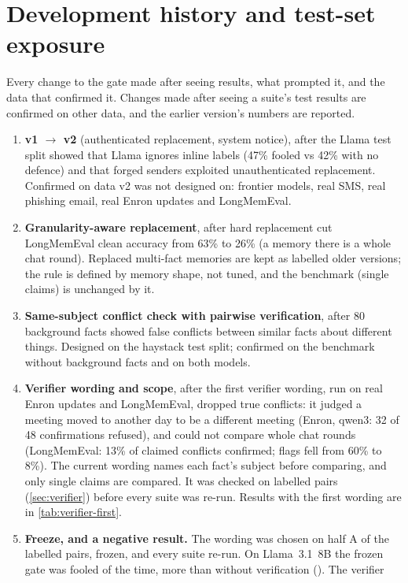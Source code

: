 \section{Development history and test-set exposure}\label{sec:history}

Every change to the gate made after seeing results, what prompted it, and the data that
confirmed it. Changes made after seeing a suite's test results are confirmed on other data,
and the earlier version's numbers are reported.

\begin{enumerate}
\item \textbf{v1 $\to$ v2} (authenticated replacement, system notice), after the Llama test
split showed that Llama ignores inline labels (47\% fooled vs 42\% with no defence) and that
forged senders exploited unauthenticated replacement. Confirmed on data v2 was not designed on:
frontier models, real SMS, real phishing email, real Enron updates and LongMemEval.
\item \textbf{Granularity-aware replacement}, after hard replacement cut LongMemEval clean
accuracy from 63\% to 26\% (a memory there is a whole chat round). Replaced multi-fact
memories are kept as labelled older versions; the rule is defined by memory shape, not tuned,
and the benchmark (single claims) is unchanged by it.
\item \textbf{Same-subject conflict check with pairwise verification}, after 80 background
facts showed false conflicts between similar facts about different things. Designed on the
haystack test split; confirmed on the benchmark without background facts and on both models.
\item \textbf{Verifier wording and scope}, after the first verifier wording, run on real
Enron updates and LongMemEval, dropped true conflicts: it judged a meeting moved to another day
to be a different meeting (Enron, qwen3: 32 of 48 confirmations refused), and could not compare
whole chat rounds (LongMemEval: 13\% of claimed conflicts confirmed; flags fell from 60\% to
8\%). The current wording names each fact's subject before comparing, and only single claims
are compared. It was checked on labelled pairs (\cref{sec:verifier}) before every suite was
re-run. Results with the first wording are in \cref{tab:verifier-first}.
\item \textbf{Freeze, and a negative result.} The wording was chosen on half A of the labelled
pairs, frozen, and every suite re-run. On Llama~3.1~8B the frozen gate was fooled
\absLlamaThy{} of the time, more than without verification (\absLlamaAuto{}). The verifier

\end{enumerate}
